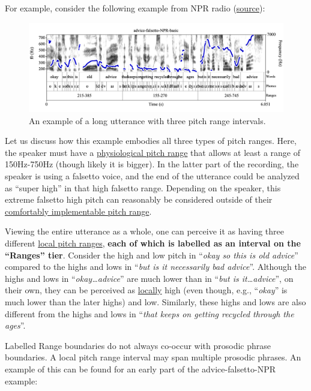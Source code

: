 \documentclass[11pt, twoside]{memoir}
\def\langtext#1{\textit{#1}}
\begin{document}
For example, consider the following example from NPR radio (\href{https://www.npr.org/sections/goatsandsoda/2018/05/11/603315432/the-best-mothers-day-gift-get-mom-out-of-the-box}{source}):

\begin{figure}[H]
\centering
%
\includegraphics[width=\linewidth]{Ranges-advice-falsetto-basic-all-3-ranges.png}
%
\caption{An example of a long utterance with three pitch range intervals.%
\label{fig:advice-falsetto Ranges basic}%
%
}
\end{figure}

Let us discuss how this example embodies all three types of pitch ranges. Here, the speaker must have a \uline{physiological pitch range} that allows at least a range of 150Hz-750Hz (though likely it is bigger). In the latter part of the recording, the speaker is using a falsetto voice, and the end of the utterance could be analyzed as “super high” in that high falsetto range. Depending on the speaker, this extreme falsetto high pitch can reasonably be considered outside of their \uline{comfortably implementable pitch range}.

Viewing the entire utterance as a whole, one can perceive it as having three different \uline{local pitch ranges}, \textbf{each of which is labelled as an interval on the “Ranges” tier}. Consider the high and low pitch in “\langtext{okay so this is old advice}” compared to the highs and lows in “\langtext{but is it necessarily bad advice}”. Although the highs and lows in “\langtext{okay\ldots advice}” are much lower than in “\langtext{but is it\ldots advice}”, on their own, they can be perceived as \uline{locally} high (even though, e.g., “\langtext{okay}” is much lower than the later highs) and low. Similarly, these highs and lows are also different from the highs and lows in “\langtext{that keeps on getting recycled through the ages}”.

Labelled Range boundaries do not always co-occur with prosodic phrase boundaries. A local pitch range interval may span multiple prosodic phrases. An example of this can be found for an early part of the advice-falsetto-NPR example:
\end{document}

